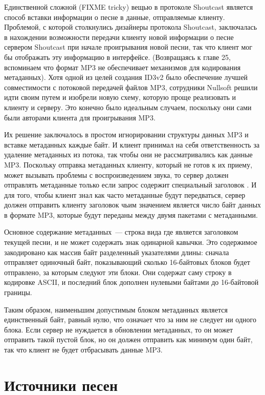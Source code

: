 Единственной сложной (FIXME tricky) вещью в протоколе Shoutcast является способ вставки
информации о песне в данные, отправляемые клиенту.  Проблемой, с которой столкнулись
дизайнеры протокола Shoutcast, заключалась в нахождении возможности передачи клиенту новой
информации о песне сервером Shoutcast при начале проигрывания новой песни, так что клиент
мог бы отображать эту информацию в интерфейсе. (Возвращаясь к главе 25, вспоминаем что
формат MP3 не обеспечивает механизмов для кодирования метаданных).  Хотя одной из целей
создания ID3v2 было обеспечение лучшей совместимости с потоковой передачей файлов MP3,
сотрудники Nullsoft решили идти своим путем и изобрели новую схему, которую проще
реализовать и клиенту и серверу.  Это конечно было идеальным случаем, поскольку они сами
были авторами клиента для проигрывания MP3.

Их решение заключалось в простом игнорировании структуры данных MP3 и вставке метаданных
каждые  байт.  И клиент принимал на себя ответственность за удаление метаданных из
потока, так чтобы они не рассматривались как данные MP3.  Поскольку отправка метаданных
клиенту, который не готов к их приему, может вызывать проблемы с воспроизведением звука,
то сервер должен отправлять метаданные только если запрос содержит специальный заголовок
.  И для того, чтобы клиент знал как часто метаданные будут
передваться, сервер должен отправить клиенту заголовок  чьим значением
является число байт данных в формате MP3, которые будут переданы между двумя пакетами с
метаданными.

Основное содержание метаданных~--- строка вида  где 
является заголовком текущей песни, и не может содержать знак одинарной кавычки.  Это
содержимое закодировано как массив байт разделенный указателями длины: сначала отправляет
одиночный байт, показывающий сколько 16-байтовых блоков будет отправлено, за которым
следуют эти блоки.  Они содержат саму строку в кодировке ASCII, и последний блок дополнен
нулевыми байтами до 16-байтовой границы.

Таким образом, наименьшим допустимым блоком метаданных является единственный байт, равный
нулю, что означает что за ним не следует ни одного блока.  Если сервер не нуждается в
обновлении метаданных, то он может отправить такой пустой блок, но он должен отправить как
минимум один байт, так что клиент не будет отбрасывать данные MP3.

\section{Источники песен}

